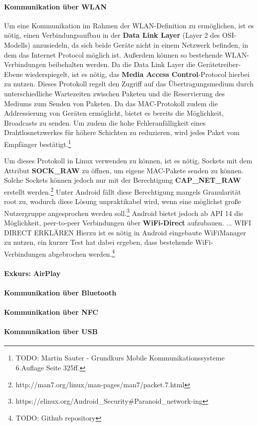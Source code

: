 \documentclass[12pt,a4paper]{article}
\begin{document}
        \paragraph{Kommunikation über WLAN}
            Um eine Kommunikation im Rahmen der WLAN-Definition zu ermöglichen, ist es nötig, einen Verbindungsaufbau in der {\bf Data Link Layer}
            (Layer 2 des OSI-Modells) anzusiedeln, da sich beide Geräte nicht in einem Netzwerk befinden, in dem das Internet Protocol möglich ist.
            Außerdem können so bestehende WLAN-Verbindungen beibehalten werden.
            Da die Data Link Layer die Gerätetreiber-Ebene wiederspiegelt, ist es nötig, das {\bf Media Access Control}-Protocol hierbei zu nutzen.
            Dieses Protokoll regelt den Zugriff auf das Übertragungsmedium durch unterschiedliche Wartezeiten zwischen Paketen und die Reservierung des Mediums zum Senden von Paketen.
            Da das MAC-Protokoll zudem die Addressierung von Geräten ermöglicht, bietet es bereits die Möglichkeit, Broadcasts zu senden.
            Um zudem die hohe Fehleranfälligkeit eines Drahtlosnetzwerkes für höhere Schichten zu reduzieren,
            wird jedes Paket vom Empfänger bestätigt.\footnote{TODO: Martin Sauter - Grundkurs Mobile Kommunikationssysteme 6.Auflage Seite 325ff.}

            Um dieses Protokoll in Linux verwenden zu können, ist es nötig, Sockets mit dem Attribut {\bf SOCK\_RAW} zu öffnen,
            um eigene MAC-Pakete senden zu können. Solche Sockets können jedoch nur mit der Berechtigung {\bf CAP\_NET\_RAW} erstellt werden.\footnote{http://man7.org/linux/man-pages/man7/packet.7.html}
            Unter Android fällt diese Berechtigung mangels Granularität root zu, wodurch diese Lösung unpraktikabel wird,
            wenn eine möglichst große Nutzergruppe angesprochen werden soll.\footnote{https://elinux.org/Android\_Security\#Paranoid\_network-ing}
            Android bietet jedoch ab API 14 die Möglichkeit, peer-to-peer Verbindungen über {\bf WiFi-Direct} aufzubauen. ... WIFI DIRECT ERKLÄREN
            Hierzu ist es nötig in Android eingebaute WiFiManager zu nutzen, ein kurzer Test hat dabei ergeben, dass bestehende WiFi-Verbindungen abgebrochen werden.\footnote{TODO: Github repository}
        \paragraph{Exkurs: AirPlay}
            
        \paragraph{Kommunikation über Bluetooth}

        \paragraph{Kommunikation über NFC}

        \paragraph{Kommunikation über USB}
\end{document}
